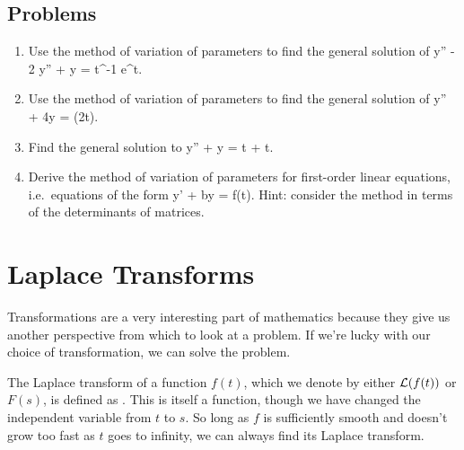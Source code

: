 \documentclass[12pt]{book}
\begin{document}
\section{Problems}

\begin{enumerate}

\item Use the method of variation of parameters to find the general solution of
  \bee
  y'' - 2 y'' + y = t^{-1} e^t.
  \eee

\item Use the method of variation of parameters to find the general solution of
  \bee
  y'' + 4y = \sin(2t).
  \eee

\item
  Find the general solution to
  \bee
  y'' + y = \tan t + t.
  \eee

\item
  Derive the method of variation of parameters for first-order linear
  equations, i.e.\ equations of the form
  \bee
  y' + by = f(t).
  \eee
  Hint: consider the method in terms of the determinants of matrices.

\end{enumerate}


\chapter{Laplace Transforms}

Transformations are a very interesting part of mathematics because they give us
another perspective from which to look at a problem. If we're lucky with
our choice of transformation, we can solve the problem.

The Laplace transform of a function $f(t)$, which we denote by either
$\mathcal{L}(f(t))$ or $F(s)$, is defined as
\be
{}.
\ee
This is itself a function, though we have changed the independent variable
from $t$ to $s$. So long as $f$ is sufficiently smooth and doesn't grow too
fast as $t$ goes to infinity, we can always find its Laplace transform.\\
\end{document}
